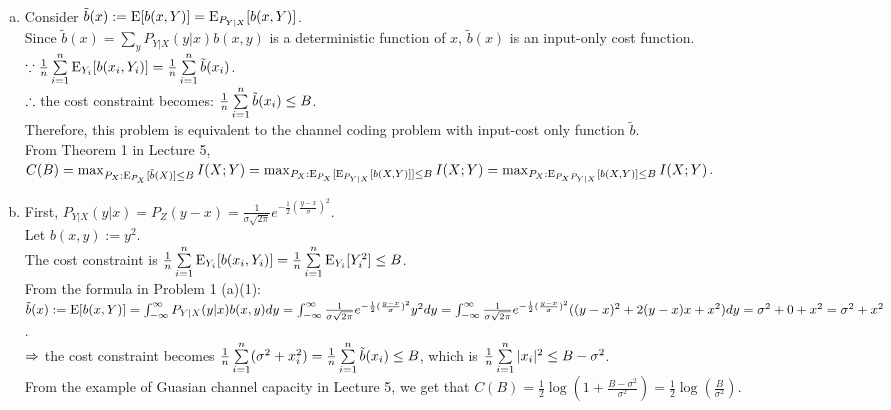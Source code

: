 \begin{pr}$ $
\begin{enumerate}[(a)]
\item \renewcommand{\b}{\tilde b}
Consider $\b(x):=\E[b(x, Y)]=\E_{P_{Y|X}}[b(x, Y)]$.\\
Since $\b(x)=\sum_yP_{Y|X}(y|x)b(x, y)$ is a deterministic function of $x$, $\b(x)$ is an input-only cost function.\\
$\cuz\frac1n\suml_{i=1}^n\E_{Y_i}[b(x_i, Y_i)]=\frac1n\suml_{i=1}^n\b(x_i)$.\\
$\therefore$ the cost constraint becomes: $\frac1n\suml_{i=1}^n\b(x_i)\leq B$.\\
Therefore, this problem is equivalent to the channel coding problem with input-cost only function $\b$.\\
From Theorem 1 in Lecture 5, $C(B)=\max_{P_X:\E_{P_X}[\b(X)]\leq B}I(X; Y)\\
=\max_{P_X:\E_{P_X}[\E_{P_{Y|X}}[b(X, Y)]]\leq B}I(X; Y)=\max_{P_X:\E_{P_XP_{Y|X}}[b(X, Y)]\leq B}I(X; Y)$.
\item First, $P_{Y|X}(y|x)=P_Z(y-x)=\frac1{\sigma\sqrt{2\pi}}e^{-\frac12(\frac{y-x}\sigma)^2}$.\\
Let $b(x, y):=y^2$.\\
The cost constraint is $\frac1n\sum\limits_{i=1}^n\mathrm{E}_{Y_i}[b(x_i, Y_i)]=\frac1n\sum\limits_{i=1}^n\mathrm{E}_{Y_i}[Y_i^2]\leq B$.\\
From the formula in Problem 1 (a)(1):\\
$\b(x):=\E[b(x, Y)]=\int_{-\infty}^\infty P_{Y|X}(y|x)b(x, y)dy=\int_{-\infty}^\infty\frac1{\sigma\sqrt{2\pi}}e^{-\frac12(\frac{y-x}\sigma)^2}y^2dy\\
=\int_{-\infty}^\infty\frac1{\sigma\sqrt{2\pi}}e^{-\frac12(\frac{y-x}\sigma)^2}((y-x)^2+2(y-x)x+x^2)dy\\
=\sigma^2+0+x^2=\sigma^2+x^2$.\\
$\Rightarrow$ the cost constraint becomes $\frac1n\suml_{i=1}^n(\sigma^2+x_i^2)=\frac1n\suml_{i=1}^n\b(x_i)\leq B$, which is $\frac1n\sum\limits_{i=1}^n|x_i|^2\leq B-\sigma^2$.\\
From the example of Guasian channel capacity in Lecture 5, we get that $C(B)=\frac12\log(1+\frac{B-\sigma^2}{\sigma^2})=\frac12\log(\frac B{\sigma^2})$.

\end{enumerate}
\end{pr}
